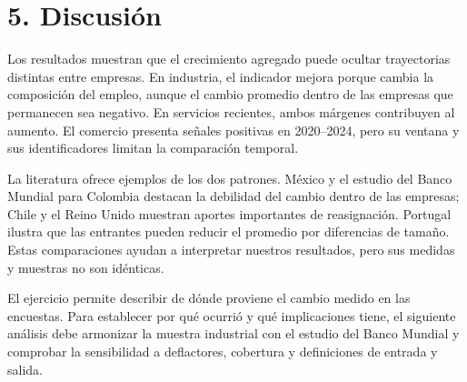 \section{5. Discusión}
Los resultados muestran que el crecimiento agregado puede ocultar trayectorias distintas entre empresas. En industria, el indicador mejora porque cambia la composición del empleo, aunque el cambio promedio dentro de las empresas que permanecen sea negativo. En servicios recientes, ambos márgenes contribuyen al aumento. El comercio presenta señales positivas en 2020--2024, pero su ventana y sus identificadores limitan la comparación temporal.

La literatura ofrece ejemplos de los dos patrones. México y el estudio del Banco Mundial para Colombia destacan la debilidad del cambio dentro de las empresas; Chile y el Reino Unido muestran aportes importantes de reasignación. Portugal ilustra que las entrantes pueden reducir el promedio por diferencias de tamaño. Estas comparaciones ayudan a interpretar nuestros resultados, pero sus medidas y muestras no son idénticas.

El ejercicio permite describir de dónde proviene el cambio medido en las encuestas. Para establecer por qué ocurrió y qué implicaciones tiene, el siguiente análisis debe armonizar la muestra industrial con el estudio del Banco Mundial y comprobar la sensibilidad a deflactores, cobertura y definiciones de entrada y salida.
